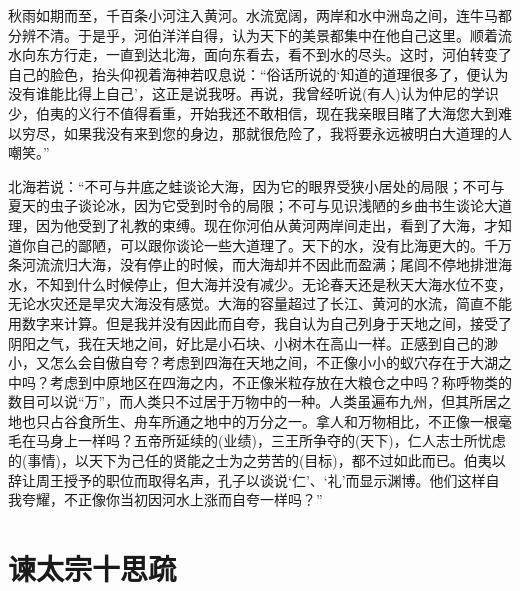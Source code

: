 \documentclass[12pt,UTF-8,openany]{ctexbook}
\begin{document}
\begin{normalsize}
    
    秋雨如期而至，千百条小河注入黄河。水流宽阔，两岸和水中洲岛之间，连牛马都分辨不清。于是乎，河伯洋洋自得，认为天下的美景都集中在他自己这里。顺着流水向东方行走，一直到达北海，面向东看去，看不到水的尽头。这时，河伯转变了自己的脸色，抬头仰视着海神若叹息说：“俗话所说的‘知道的道理很多了，便认为没有谁能比得上自己’，这正是说我呀。再说，我曾经听说(有人)认为仲尼的学识少，伯夷的义行不值得看重，开始我还不敢相信，现在我亲眼目睹了大海您大到难以穷尽，如果我没有来到您的身边，那就很危险了，我将要永远被明白大道理的人嘲笑。”
    
    北海若说：“不可与井底之蛙谈论大海，因为它的眼界受狭小居处的局限；不可与夏天的虫子谈论冰，因为它受到时令的局限；不可与见识浅陋的乡曲书生谈论大道理，因为他受到了礼教的束缚。现在你河伯从黄河两岸间走出，看到了大海，才知道你自己的鄙陋，可以跟你谈论一些大道理了。天下的水，没有比海更大的。千万条河流流归大海，没有停止的时候，而大海却并不因此而盈满；尾闾不停地排泄海水，不知到什么时候停止，但大海并没有减少。无论春天还是秋天大海水位不变，无论水灾还是旱灾大海没有感觉。大海的容量超过了长江、黄河的水流，简直不能用数字来计算。但是我并没有因此而自夸，我自认为自己列身于天地之间，接受了阴阳之气，我在天地之间，好比是小石块、小树木在高山一样。正感到自己的渺小，又怎么会自傲自夸？考虑到四海在天地之间，不正像小小的蚁穴存在于大湖之中吗？考虑到中原地区在四海之内，不正像米粒存放在大粮仓之中吗？称呼物类的数目可以说“万”，而人类只不过居于万物中的一种。人类虽遍布九州，但其所居之地也只占谷食所生、舟车所通之地中的万分之一。拿人和万物相比，不正像一根毫毛在马身上一样吗？五帝所延续的(业绩)，三王所争夺的(天下)，仁人志士所忧虑的(事情)，以天下为己任的贤能之士为之劳苦的(目标)，都不过如此而已。伯夷以辞让周王授予的职位而取得名声，孔子以谈说‘仁’、‘礼’而显示渊博。他们这样自我夸耀，不正像你当初因河水上涨而自夸一样吗？”
    
\end{normalsize}



\chapter{谏太宗十思疏}
\end{document}
